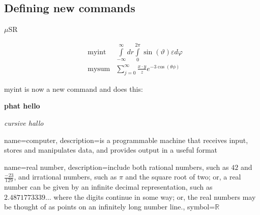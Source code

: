 \documentclass[12pt, a4paper, twopage]{scrartcl}
\begin{document}
\begin{appendix}
\section{Defining new commands}
\newcommand{\musr}{$\mu$SR }
\musr


\newcommand{\myint}{\int\limits_{-\infty}^{\infty} dr \int\limits_{0}^{2 \pi} \sin(\vartheta) \varepsilon d\varphi}

\newcommand{\mysum}[3]{\sum\limits_{j = 0}^{\infty} \frac{#1\cdot #2}{#3} e^{- 3 \cos(\theta \phi)}}

\begin{align*}
  &\text{myint} & \myint\\
  &\text{mysum} & \mysum{x}{y}{z}
\end{align*}

\renewcommand{\myint}{myint is now a new command and does this:}

\myint

\vspace{2cm}
\newcommand{\fett}[1]{{\textbf{#1}}}

\fett{phat hello}

\newcommand{\kursiv}[1]{{\textit{#1}}}

\kursiv{cursive hallo}



\end{appendix}




















{
	name=computer,
	description={is a programmable machine that receives input,
		stores and manipulates data, and provides
		output in a useful format}
}


{
	name={real number},
	description={include both rational numbers, such as $42$ and 
		$\frac{-23}{129}$, and irrational numbers, 
		such as $\pi$ and the square root of two; or,
		a real number can be given by an infinite decimal
		representation, such as $2.4871773339\ldots$ where
		the digits continue in some way; or, the real
		numbers may be thought of as points on an infinitely
		long number line.},
	symbol={\ensuremath{\mathbb{R}}}
}


\printglossary[title=My Glossary, toctitle=Glossary Title in ToC ]
\end{document}
